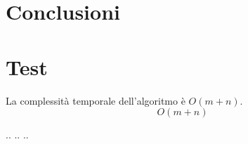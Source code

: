 \documentclass[binding=0.6cm]{sapthesis}
\begin{document}
\chapter{Conclusioni}
\chapter{Test}
La complessità temporale dell'algoritmo è $O(m+n)$.
\begin{equation}
    O(m+n)
\end{equation}

.. .. ..


\printbibliography

\backmatter
\cleardoublepage
{} %
\end{document}
